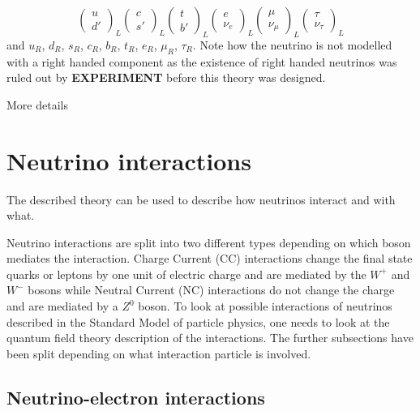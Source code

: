 \begin{equation}
\begin{pmatrix}
    u\\
    d'
\end{pmatrix}_L
\begin{pmatrix}
    c\\
    s'
\end{pmatrix}_L
\begin{pmatrix}
    t\\
    b'
\end{pmatrix}_L
\begin{pmatrix}
    e\\
    \nu_e
\end{pmatrix}_L
\begin{pmatrix}
    \mu\\
    \nu_\mu
\end{pmatrix}_L
\begin{pmatrix}
    \tau\\
    \nu_\tau
\end{pmatrix}_L
\end{equation}
and $u_R$,  $d_R$, $s_R$, $c_R$, $b_R$, $t_R$, $e_R$, $\mu_R$, $\tau_R$. 
Note how the neutrino is not modelled with a right handed component as the existence of right handed neutrinos was ruled out by \textbf{EXPERIMENT} before this theory was designed.

More details
\fi

\pagebreak

\section{Neutrino interactions}\label{subsection:Neutrino interactions}
The described theory can be used to describe how neutrinos interact and with what.

Neutrino interactions are split into two different types depending on which boson mediates the interaction.
Charge Current (CC) interactions change the final state quarks or leptons by one unit of electric charge and are mediated by the $W^+$ and $W^-$ bosons while Neutral Current (NC) interactions do not change the charge and are mediated by a $Z^0$ boson. 
To look at possible interactions of neutrinos described in the Standard Model of particle physics, one needs to look at the quantum field theory description of the interactions\cite{3Peskin, 2Hallsjo}.  The further subsections have been split depending on what interaction particle is involved.

\subsection{Neutrino-electron interactions}

